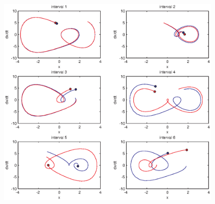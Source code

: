 \begin{figure}[htp]
\centering
\includegraphics{img/ex4/duffingchaoticposition.eps}
\caption{}
\label{fig:duffingchaoticposition}
\end{figure}
\begin{figure}[htp]
\centering
{}\\
\caption{}
\label{fig:}
\end{figure}


